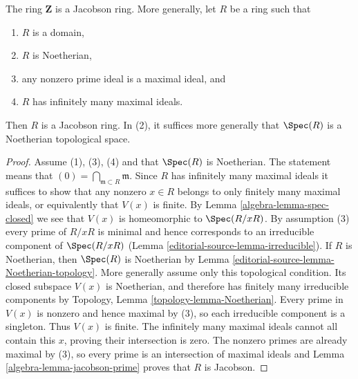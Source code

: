 \begin{lemma}
\label{editorial-source-lemma-pid-jacobson}
The ring $\mathbf{Z}$ is a Jacobson ring.
More generally, let $R$ be a ring such that
\begin{enumerate}
\item $R$ is a domain,
\item $R$ is Noetherian,
\item any nonzero prime ideal is a maximal ideal, and
\item $R$ has infinitely many maximal ideals.
\end{enumerate}
Then $R$ is a Jacobson ring. In (2), it suffices more generally
that $\Spec(R)$ is a Noetherian topological space.
\end{lemma}

\begin{proof}
Assume (1), (3), (4) and that $\Spec(R)$ is Noetherian. The statement
means that $(0) = \bigcap_{\mathfrak m \subset R} \mathfrak m$.
Since $R$ has infinitely many maximal ideals it suffices to
show that any nonzero $x\in R$ belongs to only finitely many
maximal ideals, or equivalently that $V(x)$ is finite.
By Lemma \ref{algebra-lemma-spec-closed}
we see that $V(x)$ is homeomorphic to $\Spec(R/xR)$.
By assumption (3) every prime of $R/xR$ is minimal and hence
corresponds to an irreducible component of $\Spec(R/xR)$
(Lemma \ref{editorial-source-lemma-irreducible}).
If $R$ is Noetherian, then $\Spec(R)$ is Noetherian by
Lemma \ref{editorial-source-lemma-Noetherian-topology}. More generally assume only
this topological condition. Its closed subspace $V(x)$ is Noetherian,
and therefore has finitely many irreducible components by Topology,
Lemma \ref{topology-lemma-Noetherian}. Every prime in $V(x)$ is
nonzero and hence maximal by (3), so each irreducible component is
a singleton. Thus $V(x)$ is finite. The infinitely many maximal
ideals cannot all contain this $x$, proving their intersection is zero.
The nonzero primes are already maximal by (3), so every prime is an
intersection of maximal ideals and Lemma \ref{algebra-lemma-jacobson-prime}
proves that $R$ is Jacobson.
\end{proof}